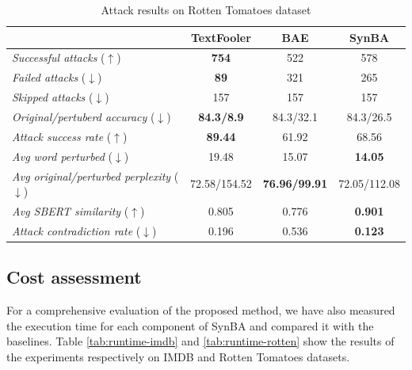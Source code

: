 \begin{table}[h]
    \footnotesize
    \centering
    \begin{tabular}{|l|c|c|c|}
        \hline
        {} &           \textbf{TextFooler} &   \textbf{BAE} &    \textbf{SynBA} \\
        \hline \hline
        \emph{Successful attacks} ($\uparrow$)           &    \textbf{754} &   522                &         578 \\
        \emph{Failed  attacks} ($\downarrow$)              &     \textbf{89} &   321                &         265 \\
        \emph{Skipped  attacks} ($\downarrow$)            &    157 &   157                &         157 \\
        \emph{Original/pertuberd accuracy} ($\downarrow$)  &   \textbf{84.3/8.9} &  84.3/32.1       &  84.3/26.5 \\
        \emph{Attack success rate} ($\uparrow$)          &   \textbf{89.44} &     61.92  &    68.56 \\
        \emph{Avg word perturbed} ($\downarrow$)          &   19.48 &     15.07           &    \textbf{14.05} \\
        \emph{Avg original/perturbed perplexity} ($\downarrow$)    &   72.58/154.52 &     \textbf{76.96/99.91}          &    72.05/112.08 \\
        \emph{Avg SBERT similarity} ($\uparrow$)        &   0.805 &     0.776           &    \textbf{0.901} \\
        \emph{Attack contradiction rate} ($\downarrow$)    &   0.196 &     0.536           &    \textbf{0.123} \\
        \hline
        \end{tabular}

    \caption{Attack results on Rotten Tomatoes dataset}
    \label{tab:results-rotten}
\end{table}





\subsection{Cost assessment}\label{subsec:quantitative-evaluation}

For a comprehensive evaluation of the proposed method, we have also measured the execution time for each component of SynBA and compared it with the baselines.
Table \ref{tab:runtime-imdb} and \ref{tab:runtime-rotten}  show the results of the experiments respectively on IMDB and Rotten Tomatoes datasets.

